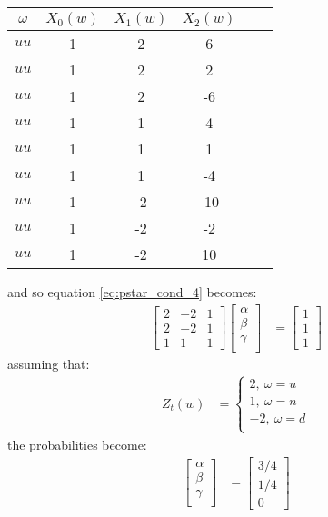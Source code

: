 \documentclass{article}
\begin{document}
\begin{center}
\begin{tabular}{|c|c|c|c|c|c|}
\hline 
$\omega$ & $X_0(w)$ & $X_1(w)$ & $X_2(w)$ \\
\hline 
\hline 
$uu$ & 1 & 2 & 6 \\\hline
$uu$ & 1 & 2 & 2 \\\hline
$uu$ & 1 & 2 & -6 \\\hline
$uu$ & 1 & 1 & 4 \\\hline
$uu$ & 1 & 1 & 1 \\\hline
$uu$ & 1 & 1 & -4 \\\hline
$uu$ & 1 & -2 & -10 \\\hline
$uu$ & 1 & -2 & -2 \\\hline
$uu$ & 1 & -2 & 10 \\\hline
\end{tabular}
\end{center}
and so equation \ref{eq:pstar_cond_4} becomes:
\begin{align} 
\left[\begin{array}{cccc}
2 & -2 & 1\\
2 & -2 & 1\\
1 & 1 & 1 
\end{array} \right]
\left[\begin{array}{c}
\alpha\\
\beta\\
\gamma\\
\end{array} \right] &= \left[\begin{array}{c}
1\\
1\\
1
\end{array} \right]
\end{align}
assuming that:
\begin{align*}
Z_t(w) &= \begin{cases}
    2, \medspace \omega=u \\
    1, \medspace \omega=n \\
    -2, \medspace \omega=d \\
\end{cases}
\end{align*}
the probabilities become: 
\begin{align} 
\left[\begin{array}{c}
\alpha\\
\beta\\
\gamma\\
\end{array} \right] &= \left[\begin{array}{c}
3/4\\
1/4\\
0
\end{array} \right]
\end{align}
\end{document}
